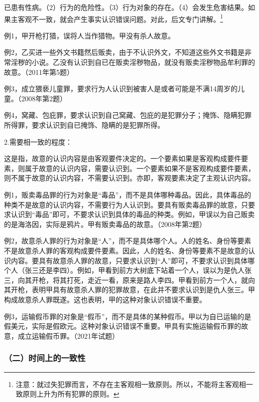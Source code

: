 已患有性病。（2）行为的危险性。（3）行为对象的存在。（4）会发生危害结果。如果主客观不一致，就会产生事实认识错误问题。对此，后文专门讲解。\footnote{注意：就过失犯罪而言，不存在主客观相一致原则。所以，不能将主客观相一致原则上升为所有犯罪的原则。}


例1，甲开枪打猎，误将人当作猎物。甲没有杀人故意。

例2，乙买进一些外文书籍然后贩卖，由于不认识外文，不知道这些外文书籍是非常淫秽的小说。乙没有认识到自已在贩卖淫秽物品，就没有贩卖淫秽物品牟利罪的故意。（2011年第5题）

例3，成立猥亵儿童罪，要求行为人认识到被害人是或者可能是不满14周岁的儿童。（2008年第2题）

例4，窝藏、包庇罪，要求认识到自己窝藏、包庇的是犯罪分子；掩饰、隐瞒犯罪所得罪，要求认识到自已掩饰、隐瞒的是犯罪所得。

2.需要相一致的程度：

这是指，故意的认识内容是由客观要件决定的。一个要素如果是客观构成要件要素，则属于故意的认识内容，需要认识到。一个要素如果不是客观构成要件要素，则不属于故意的认识内容，不需要认识到。亦即，客观要素决定了主观认识内容。

例1，贩卖毒品罪的行为对象是“毒品”，而不是具体哪种毒品。因此，具体毒品的种类不是故意的认识内容，不需要行为人认识到。要具有贩卖毒品罪的故意，只要求认识到“毒品”即可，不要求认识到具体的毒品的种类。例如，甲误以为自己贩卖的是海洛因，实际是鸦片。甲有贩卖毒品的故意。（2008年第2题）

例2，故意杀人罪的行为对象是“人”，而不是具体哪个人。人的姓名、身份等要素不是故意杀人罪的客观构成要件要素。因此，人的姓名、身份等要素不是故意的认识内容。要具有故意杀人罪的故意，只要求认识到“人”即可，不要求认识到具体哪个人（张三还是李四）。例如，甲看到前方大树底下站着一个人，误以为是仇人张三，向其开枪，将其打死，走近一看，原来是路人李四。甲看到前方一个人，就向其开枪，表明甲具有故意杀人罪的犯罪故意，在此并不要求认识到是仇人张三。甲构成故意杀人罪既遂。这也表明，甲的这种对象认识错误不重要。

例3，运输假币罪的对象是“假币”，而不是具体的某种假币。甲以为自已运输的是假美元，实际是假欧元。这种对象认识错误不重要。甲具有实施运输假币罪的故意，成立运输假币罪。（2021年试题）

\subsubsection*{（二）时间上的一致性}


